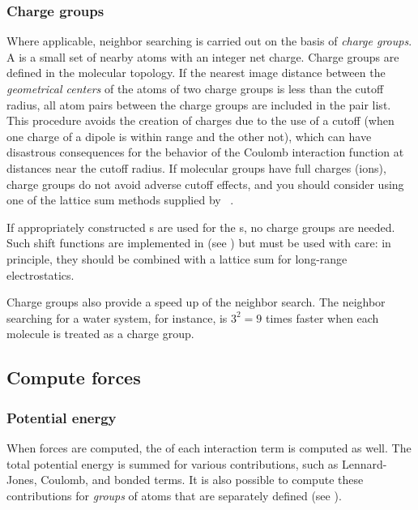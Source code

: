{\subsubsection{Charge groups}
Where applicable, neighbor searching is carried out on the basis of
{\em charge groups}. A  is a small set of
nearby atoms with an integer net charge. Charge groups are defined in
the molecular topology. If the nearest image distance between the {\em
geometrical centers} of the atoms of two charge groups is less than
the cutoff radius, all atom pairs between the charge groups are
included in the pair list. This procedure avoids the creation of
charges due to the use of a cutoff (when one charge of a dipole is
within range and the other not), which can have disastrous
consequences for the behavior of the Coulomb interaction function at
distances near the cutoff radius. If molecular groups have full
charges (ions), charge groups do not avoid adverse cutoff effects,
and you should consider using one of the lattice sum methods supplied
by {\gromacs}~\cite{Berendsen93a}.

If appropriately
constructed s are used for the 
s, no
charge groups are needed. Such shift functions are implemented in
{\gromacs} (see ) but must be used with care: in principle,
they should be combined with a lattice sum for long-range
electrostatics.

Charge groups also provide a speed up of the neighbor search.
The neighbor searching for a water system, for instance,
is $3^2=9$ times faster when each molecule is treated as a charge group.
} %

\subsection{Compute forces}
\label{subsec:forces}

\subsubsection{Potential energy}
When forces are computed, the  of each
interaction term is computed as well. The total potential energy is
summed for various contributions, such as Lennard-Jones, Coulomb, and
bonded terms. It is also possible to compute these contributions for
{\em groups} of atoms that are separately defined (see
).

